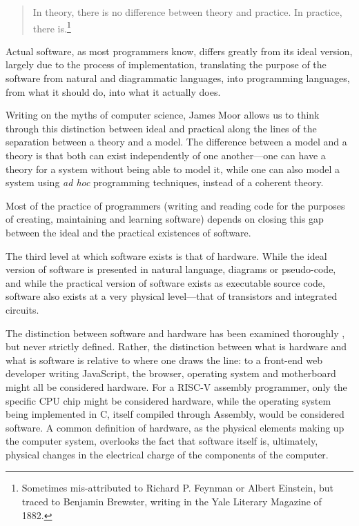 \begin{quote}
    In theory, there is no difference between theory and practice. In practice, there is.\footnote{Sometimes mis-attributed to Richard P. Feynman or Albert Einstein, but traced to Benjamin Brewster, writing in the Yale Literary Magazine of 1882.}
\end{quote}

Actual software, as most programmers know, differs greatly from its ideal version, largely due to the process of implementation, translating the purpose of the software from natural and diagrammatic languages, into programming languages, from what it should do, into what it actually does.

Writing on the myths of computer science, James Moor \citep{moor_three_1978} allows us to think through this distinction between ideal and practical along the lines of the separation between a theory and a model. The difference between a model and a theory is that both can exist independently of one another—one can have a theory for a system without being able to model it, while one can also model a system using \emph{ad hoc} programming techniques, instead of a coherent theory.

Most of the practice of programmers (writing and reading code for the purposes of creating, maintaining and learning software) depends on closing this gap between the ideal and the practical existences of software.

The third level at which software exists is that of hardware. While the ideal version of software is presented in natural language, diagrams or pseudo-code, and while the practical version of software exists as executable source code, software also exists at a very physical level—that of transistors and integrated circuits.

The distinction between software and hardware has been examined thoroughly \citep{kittler_there_1997,chun_sourcery_2008,rapaport_philosophy_2005}, but never strictly defined. Rather, the distinction between what is hardware and what is software is relative to where one draws the line: to a front-end web developer writing JavaScript, the browser, operating system and motherboard might all be considered hardware. For a RISC-V assembly programmer, only the specific CPU chip might be considered hardware, while the operating system being implemented in C, itself compiled through Assembly, would be considered software. A common definition of hardware, as the physical elements making up the computer system, overlooks the fact that software itself is, ultimately, physical changes in the electrical charge of the components of the computer.

